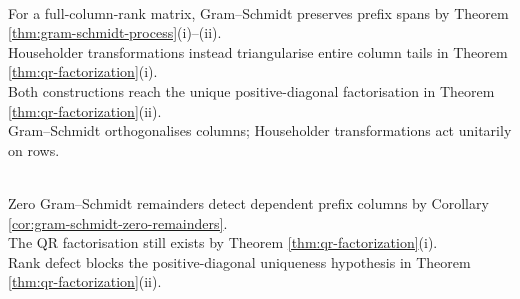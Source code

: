 \begin{perspective} \label{per:gram-schmidt-householder-qr} \\
For a full-column-rank matrix, Gram--Schmidt preserves prefix spans by Theorem \ref{thm:gram-schmidt-process}(i)--(ii).\\
Householder transformations instead triangularise entire column tails in Theorem \ref{thm:qr-factorization}(i).\\
Both constructions reach the unique positive-diagonal factorisation in Theorem \ref{thm:qr-factorization}(ii).\\
Gram--Schmidt orthogonalises columns; Householder transformations act unitarily on rows.
\end{perspective}

\begin{perspective} \label{per:rank-deficient-gram-schmidt-qr} \\
Zero Gram--Schmidt remainders detect dependent prefix columns by Corollary \ref{cor:gram-schmidt-zero-remainders}.\\
The QR factorisation still exists by Theorem \ref{thm:qr-factorization}(i).\\
Rank defect blocks the positive-diagonal uniqueness hypothesis in Theorem \ref{thm:qr-factorization}(ii).
\end{perspective}

